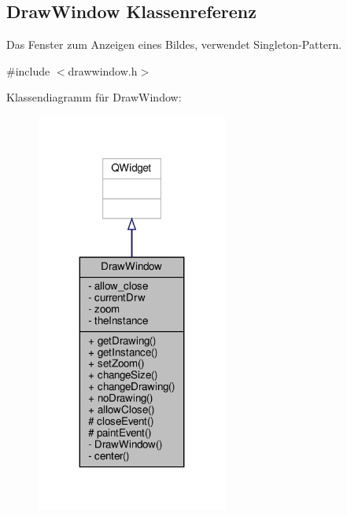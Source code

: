 \hypertarget{classDrawWindow}{}\subsection{Draw\+Window Klassenreferenz}
\label{classDrawWindow}


Das Fenster zum Anzeigen eines Bildes, verwendet Singleton-\/\+Pattern.  




{\ttfamily \#include $<$drawwindow.\+h$>$}



Klassendiagramm für Draw\+Window\+:
\nopagebreak
\begin{figure}[H]
\begin{center}
\leavevmode
\includegraphics[width=179pt]{classDrawWindow__inherit__graph}
\end{center}
\end{figure}



